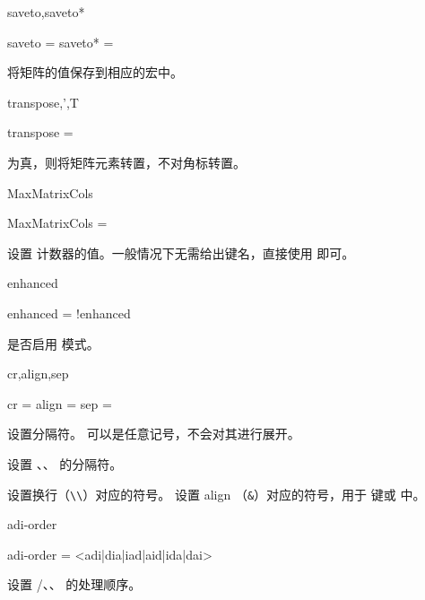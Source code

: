 \documentclass{ctxdoc}
\begin{document}
\begin{function}{saveto,saveto*}
    \begin{syntax}
        saveto  = 
        saveto* = 
    \end{syntax}
    将矩阵的值保存到相应的宏中。
\end{function}

\begin{function}{transpose,',T}
    \begin{syntax}
        transpose = \TTF {}
    \end{syntax}
    为真，则将矩阵元素转置，不对角标转置。
\end{function}

\begin{function}{MaxMatrixCols}
    \begin{syntax}
        MaxMatrixCols = 
    \end{syntax}
    设置  计数器的值。一般情况下无需给出键名，直接使用  即可。
\end{function}

\begin{function}{enhanced}
    \begin{syntax}
        enhanced = \TTF {}
        !enhanced
    \end{syntax}
    是否启用  模式。
\end{function}

\begin{function}{cr,align,sep}
    \begin{syntax}
        cr    =  \init{;}
        align =  \init{,}
        sep   =  \init{,}
    \end{syntax}
    设置分隔符。 可以是任意记号，不会对其进行展开。

     设置 、、 的分隔符。

     设置换行（\verb|\\|）对应的符号。 设置 align （\verb|&|）对应的符号，用于  键或  中。
\end{function}

\begin{function}{adi-order}
    \begin{syntax}
        adi-order = <adi|dia|iad|aid|ida|dai> 
    \end{syntax}
    设置 /、、 的处理顺序。
\end{function}
\end{document}
